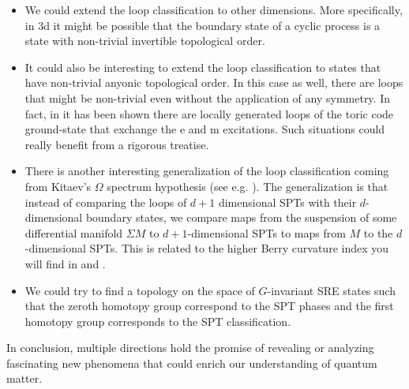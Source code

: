 \begin{itemize}
	\item We could extend the loop classification to other dimensions. More specifically, in 3d it might be possible that the boundary state of a cyclic process is a state with non-trivial invertible topological order.
	\item It could also be interesting to extend the loop classification to states that have non-trivial anyonic topological order. In this case as well, there are loops that might be non-trivial even without the application of any symmetry. In fact, in \cite{Aasen_2022} it has been shown there are locally generated loops of the toric code ground-state that exchange the e and m excitations. Such situations could really benefit from a rigorous treatise.
	\item There is another interesting generalization of the loop classification coming from Kitaev's $\Omega$ spectrum hypothesis (see e.g. \cite{Xiong_2018}). The generalization is that instead of comparing the loops of $d+1$ dimensional SPTs with their $d$-dimensional boundary states, we compare maps from the suspension of some differential manifold $\Sigma M$ to $d+1$-dimensional SPTs to maps from $M$ to the $d$-dimensional SPTs. This is related to the higher Berry curvature index you will find in \cite{Kapustin_2022} and \cite{artymowicz2023quantization}.
	\item We could try to find a topology on the space of $G$-invariant SRE states such that the zeroth homotopy group correspond to the SPT phases and the first homotopy group corresponds to the SPT classification.
\end{itemize}
In conclusion, multiple directions hold the promise of revealing or analyzing fascinating new phenomena that could enrich our understanding of quantum matter.
\cleardoublepage

